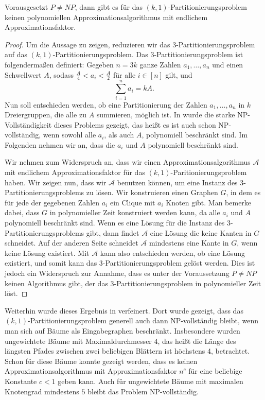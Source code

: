 \begin{thm}
    Vorausgesetzt $P \neq NP$, dann gibt es für das $(k,1)$-Partitionierungsproblem keinen polynomiellen Approximationsalgorithmus mit endlichem Approximationsfaktor.
\end{thm}
\begin{proof}
    Um die Aussage zu zeigen, reduzieren wir das $3$-Partitionierungsproblem auf das $(k,1)$-Partitionierungsproblem. 
    Das $3$-Partitionierungsproblem ist folgendermaßen definiert: Gegeben $n = 3k$ ganze Zahlen $a_1,\ldots, a_n$ und einen Schwellwert $A$, sodass $\frac{A}{4} < a_i < \frac{A}{2}$ für alle $i \in [n]$ gilt, und 
    \begin{equation*}
        \sum_{i=1}^{n} a_i = kA.
    \end{equation*}
    Nun soll entschieden werden, ob eine Partitionierung der Zahlen $a_1, \ldots, a_n$ in $k$ Dreiergruppen, die alle zu $A$ summieren, möglich ist. 
    In \parencite{gj79} wurde die starke NP-Vollständigkeit dieses Problems gezeigt, das heißt es ist auch schon NP-vollständig, wenn sowohl alle $a_i$, als auch $A$, polynomiell beschränkt sind.
	Im Folgenden nehmen wir an, dass die $a_i$ und $A$ polynomiell beschränkt sind.

    \noindent Wir nehmen zum Widerspruch an, dass wir einen Approximationsalgorithmus $\mathcal{A}$ mit endlichem Approximationsfaktor für das $(k,1)$-Paritionierungsproblem haben. 
    Wir zeigen nun, dass wir $\mathcal{A}$ benutzen können, um eine Instanz des $3$-Partitionierungsproblems zu lösen.
    Wir konstruieren einen Graphen $G$, in dem es für jede der gegebenen Zahlen $a_i$ ein Clique mit $a_i$ Knoten gibt.
	Man bemerke dabei, dass $G$ in polynomieller Zeit konstruiert werden kann, da alle $a_i$ und $A$ polynomiell beschränkt sind.
    Wenn es eine Lösung für die Instanz des $3$-Partitionierungsproblems gibt, dann findet $\mathcal{A}$ eine Lösung die keine Kanten in $G$ schneidet. 
    Auf der anderen Seite schneidet $\mathcal{A}$ mindestens eine Kante in $G$, wenn keine Lösung existiert.
    Mit $\mathcal{A}$ kann also entschieden werden, ob eine Lösung existiert, und somit kann das $3$-Partitionierungsproblem gelöst werden.
    Dies ist jedoch ein Widerspruch zur Annahme, dass es unter der Voraussetzung $P \neq NP$ keinen Algorithmus gibt, der das $3$-Partitionierungsproblem in polynomieller Zeit löst.
\end{proof}

Weiterhin wurde dieses Ergebnis in \parencite{ff13} verfeinert. 
Dort wurde gezeigt, dass das $(k,1)$-Partitionierungsproblem generell auch dann NP-vollständig bleibt, wenn man sich auf Bäume als Eingabegraphen beschränkt.
Insbesondere wurden ungewichtete Bäume mit Maximaldurchmesser $4$, das heißt die Länge des längsten Pfades zwischen zwei beliebigen Blättern ist höchstens 4, betrachtet.
Schon für diese Bäume konnte gezeigt werden, dass es keinen Approximationsalgorithmus mit Approximationsfaktor $n^c$ für eine beliebige Konstante $c < 1$ geben kann.
Auch für ungewichtete Bäume mit maximalen Knotengrad mindestens $5$ bleibt das Problem NP-vollständig.

